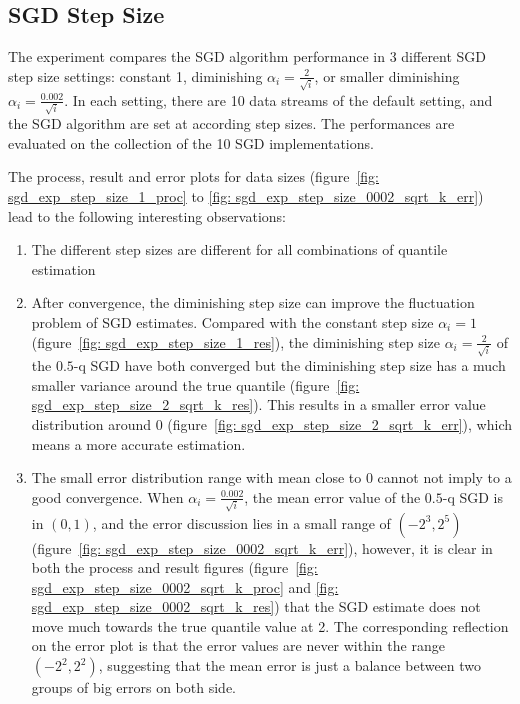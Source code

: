 \subsection{SGD Step Size}
\label{subsec: sgd_exp_step_size}
The experiment compares the SGD algorithm performance in 3 different SGD step size settings: constant 1, diminishing $\alpha_i= \frac{2}{\sqrt{i}}$, or smaller diminishing $\alpha_i= \frac{0.002}{\sqrt{i}}$. In each setting, there are 10 data streams of the default setting, and the SGD algorithm are set at according step sizes. The performances are evaluated on the collection of the 10 SGD implementations.

The process, result and error plots for data sizes (figure~\ref{fig: sgd_exp_step_size_1_proc} to \ref{fig: sgd_exp_step_size_0002_sqrt_k_err}) lead to the following interesting observations:
\begin{enumerate}
    \item The different step sizes are different for all combinations of quantile estimation
    
    \item After convergence, the diminishing step size can improve the fluctuation problem of SGD estimates. Compared with the constant step size $\alpha_i= 1$ (figure~\ref{fig: sgd_exp_step_size_1_res}), the diminishing step size $\alpha_i= \frac{2}{\sqrt{i}}$ of the $0.5$-q SGD have both converged but the diminishing step size has a much smaller variance around the true quantile (figure~\ref{fig: sgd_exp_step_size_2_sqrt_k_res}). 
    This results in a smaller error value distribution around $0$ (figure~\ref{fig: sgd_exp_step_size_2_sqrt_k_err}), which means a more accurate estimation.

    \item The small error distribution range with mean close to 0 cannot not imply to a good convergence. When $\alpha_i= \frac{0.002}{\sqrt{i}}$, the mean error value of the $0.5$-q SGD is in $(0,1)$, and the error discussion lies in a small range of $(-2^3, 2^5)$ (figure~\ref{fig: sgd_exp_step_size_0002_sqrt_k_err}), however, it is clear in both the process and result figures (figure~\ref{fig: sgd_exp_step_size_0002_sqrt_k_proc} and \ref{fig: sgd_exp_step_size_0002_sqrt_k_res}) that the SGD estimate does not move much towards the true quantile value at 2. The corresponding reflection on the error plot is that the error values are never within the range $(-2^2, 2^2)$, suggesting that the mean error is just a balance between two groups of big errors on both side. 
\end{enumerate}
